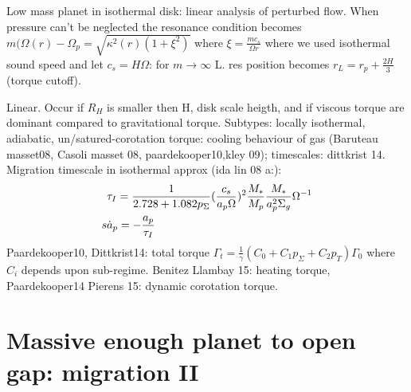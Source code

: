 \begin{workout}
Low mass planet in isothermal disk: linear analysis of perturbed flow.
When pressure can't be neglected the resonance condition becomes $m(\Omega(r)-\Omega_p=\sqrt{\kappa^2(r)(1+\xi^2)}$ where $\xi=\frac{mc_s}{\Omega r}$ where we used isothermal sound speed and let $c_s=H\Omega$: for $m\to\infty$ L. res position becomes $r_L=r_p+\frac{2H}{3}$ (torque cutoff).

Linear. Occur if $R_H$ is smaller then H, disk scale heigth, and if viscous torque are dominant compared to gravitational torque.
Subtypes: locally isothermal, adiabatic, un/satured-corotation torque: cooling behaviour of gas (Baruteau masset08, Casoli masset 08, paardekooper10,kley 09); timescales: dittkrist 14.
Migration timescale in isothermal approx (ida lin 08 a:):
\begin{align*}
&\tau_I=\frac{1}{2.728+1.082p_{\Sigma}}(\frac{c_s}{a_p\Omega})^2\frac{M_*}{M_p}\frac{M_*}{a_p^2\Sigma_g}\Omega^{-1}\\
s&\dot{a}_p=-\frac{a_p}{\tau_I}
\end{align*}
Paardekooper10, Dittkrist14: total torque $\Gamma_t=\frac{1}{\gamma}(C_0+C_1p_{\Sigma}+C_2p_T)\Gamma_0$ where $C_i$ depends upon sub-regime.
Benitez Llambay 15: heating torque, Paardekooper14 Pierens 15: dynamic corotation torque.
\end{workout}

\section{Massive enough planet to open gap: migration II}


